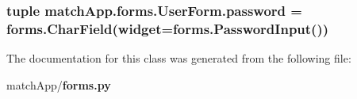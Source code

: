 \subsubsection[{password}]{\setlength{\rightskip}{0pt plus 5cm}tuple match\+App.\+forms.\+User\+Form.\+password = forms.\+Char\+Field(widget=forms.\+Password\+Input())\hspace{0.3cm}{\ttfamily [static]}}\label{classmatch_app_1_1forms_1_1_user_form_a22fba20516b0361b6db1a96fc08c5053}


The documentation for this class was generated from the following file\+:\begin{DoxyCompactItemize}
\item 
match\+App/{\bf forms.\+py}\end{DoxyCompactItemize}
